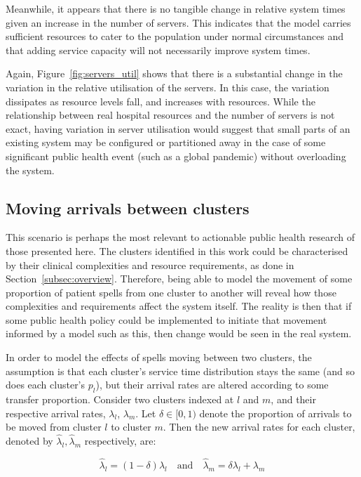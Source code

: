\documentclass[]{interact}
\theoremstyle{plain}%
\theoremstyle{definition}
\theoremstyle{remark}
\begin{document}
Meanwhile, it appears that there is no tangible change in relative system times
given an increase in the number of servers. This indicates that the model
carries sufficient resources to cater to the population under normal
circumstances and that adding service capacity will not necessarily improve
system times.

Again, Figure~\ref{fig:servers_util} shows that there is a substantial change in
the variation in the relative utilisation of the servers. In this case, the
variation dissipates as resource levels fall, and increases with resources.
While the relationship between real hospital resources and the number of servers
is not exact, having variation in server utilisation would suggest that small
parts of an existing system may be configured or partitioned away in the case of
some significant public health event (such as a global pandemic) without
overloading the system.


\subsection{Moving arrivals between clusters}\label{subsec:moving}

This scenario is perhaps the most relevant to actionable public health research
of those presented here. The clusters identified in this work could be
characterised by their clinical complexities and resource requirements, as done
in Section~\ref{subsec:overview}. Therefore, being able to model the movement of
some proportion of patient spells from one cluster to another will reveal how
those complexities and requirements affect the system itself. The reality is
then that if some public health policy could be implemented to initiate that
movement informed by a model such as this, then change would be seen in the real
system.

In order to model the effects of spells moving between two clusters, the
assumption is that each cluster's service time distribution stays the same (and
so does each cluster's \(p_l\)), but their arrival rates are altered according
to some transfer proportion. Consider two clusters indexed at \(l\) and \(m\),
and their respective arrival rates, \(\lambda_l\), \(\lambda_m\). Let \(\delta
\in [0, 1)\) denote the proportion of arrivals to be moved from cluster \(l\) to
cluster \(m\). Then the new arrival rates for each cluster, denoted by
\(\hat\lambda_l, \hat\lambda_m\) respectively, are:

\begin{equation}\label{eq:moving}
    \hat\lambda_l = \left(1 - \delta\right) \lambda_l
    \quad \text{and} \quad
    \hat\lambda_m = \delta\lambda_l + \lambda_m
\end{equation}
\end{document}
